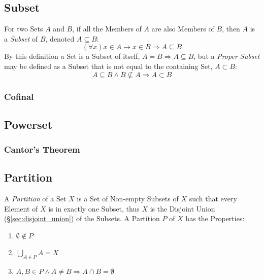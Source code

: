 \subsection{Subset}\label{sec:subset}

For two Sets $A$ and $B$, if all the Members of $A$ are also Members
of $B$, then $A$ is a \emph{Subset} of $B$, denoted $A \subseteq B$:
\[
  (\forall x) x \in A \rightarrow x \in B \Rightarrow A \subseteq B
\]
By this definition a Set is a Subset of itself, $A = B \Rightarrow A
\subseteq B$, but a \emph{Proper Subset} may be defined as a Subset
that is not equal to the containing Set, $A \subset B$:
\[
  A \subseteq B \wedge B \nsubseteq A \Rightarrow A \subset B
\]



\subsubsection{Cofinal}\label{sec:coinitial_cofinal}



\subsection{Powerset}\label{sec:powerset}

\subsubsection{Cantor's Theorem}\label{sec:cantors_theorem}



\subsection{Partition}\label{sec:partition}

A \emph{Partition} of a Set $X$ is a Set of Non-empty Subsets of $X$
such that every Element of $X$ is in exactly one Subset, thus $X$ is
the Disjoint Union (\S\ref{sec:disjoint_union}) of the Subsets. A
Partition $P$ of $X$ has the Properties:
\begin{enumerate}
  \item $\emptyset \notin P$
  \item $\bigcup_{A \in P}A = X$
  \item $A,B \in P \wedge A \neq B \Rightarrow A \cap B = \emptyset$
\end{enumerate}




